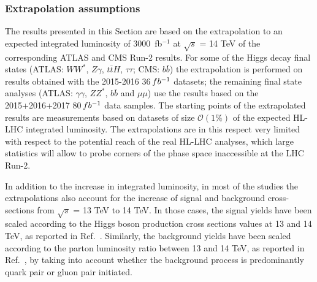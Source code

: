 \subsubsection{Extrapolation assumptions}
\label{sec:HiggsExtrapAss}


The results presented in this Section are based on the extrapolation to an expected integrated luminosity of 3000~fb$^{-1}$ at $\sqrt{s}$ = 14 TeV of the corresponding ATLAS and CMS Run-2 results. For some of the Higgs decay final states (ATLAS: $WW^*$, $Z\gamma$, $t\bar{t}H$, $\tau\tau$; CMS: $b\bar{b}$) the extrapolation is performed on results obtained with the 2015-2016 36\,$fb^{-1}$ datasets; the remaining final state analyses (ATLAS: $\gamma\gamma$, $ZZ^*$, $b\bar{b}$ and $\mu\mu$) use the results based on the 2015+2016+2017 80\,$fb^{-1}$ data samples. The starting points of the extrapolated results are measurements based on datasets of size $\mathcal{O}(1\%)$ of the expected HL-LHC integrated luminosity. The extrapolations are in this respect very limited with respect to the potential reach of the real HL-LHC analyses, which large statistics will allow to probe corners of the phase space inaccessible at the LHC Run-2.
    
In addition to the increase in integrated luminosity, in most of the studies the extrapolations also account for the increase of signal and background cross-sections from $\sqrt{s}$ = 13 TeV to 14 TeV.  In those cases, the signal yields have been scaled according to the Higgs boson production cross sections values at 13 and 14 TeV, as reported in Ref.~\cite{deFlorian:2016spz}. Similarly, the background yields have been scaled according to the parton luminosity ratio between 13 and 14 TeV, as reported in Ref.~\cite{Heinemeyer:2013tqa}, by taking into account whether the background process is predominantly quark pair or gluon pair initiated.

